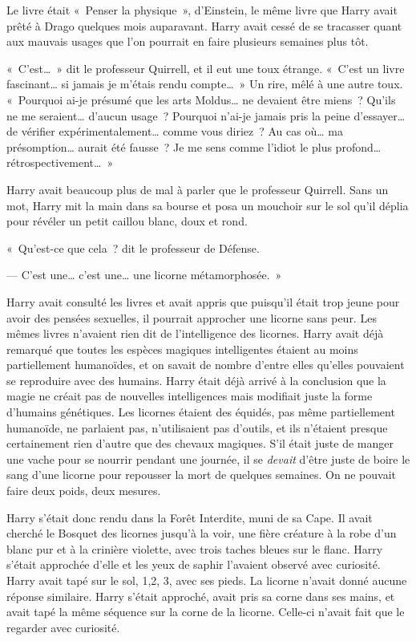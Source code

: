 Le livre était «~Penser la physique~», d'Einstein, le même livre que Harry avait prêté à Drago quelques mois auparavant.
Harry avait cessé de se tracasser quant aux mauvais usages que l'on pourrait en faire plusieurs semaines plus tôt.

«~C'est…~»
 dit le professeur Quirrell, et il eut une toux étrange.
«~C'est un livre fascinant… si jamais je m'étais rendu compte…~»
Un rire, mêlé à une autre toux.
«~Pourquoi ai-je présumé que les arts Moldus… ne devaient être miens~?
Qu'ils ne me seraient… d'aucun usage~?
Pourquoi n'ai-je jamais pris la peine d'essayer… de vérifier expérimentalement… comme vous diriez~?
Au cas où… ma présomption… aurait été fausse~?
Je me sens comme l'idiot le plus profond… rétrospectivement…~»

Harry avait beaucoup plus de mal à parler que le professeur Quirrell.
Sans un mot, Harry mit la main dans sa bourse et posa un mouchoir sur le sol qu'il déplia pour révéler un petit caillou blanc, doux et rond.

«~Qu'est-ce que cela~? dit le professeur de Défense.

--- C'est une… c'est une… une licorne métamorphosée.~»

Harry avait consulté les livres et avait appris que puisqu'il était trop jeune pour avoir des pensées sexuelles, il pourrait approcher une licorne sans peur.
Les mêmes livres n'avaient rien dit de l'intelligence des licornes.
Harry avait déjà remarqué que toutes les espèces magiques intelligentes étaient au moins partiellement humanoïdes, et on savait de nombre d'entre elles qu'elles pouvaient se reproduire avec des humains.
Harry était déjà arrivé à la conclusion que la magie ne créait pas de nouvelles intelligences mais modifiait juste la forme d'humains génétiques.
Les licornes étaient des équidés, pas même partiellement humanoïde, ne parlaient pas, n'utilisaient pas d'outils, et ils n'étaient presque certainement rien d'autre que des chevaux magiques.
S'il était juste de manger une vache pour se nourrir pendant une journée, il se \emph{devait} d'être juste de boire le sang d'une licorne pour repousser la mort de quelques semaines.
On ne pouvait faire deux poids, deux mesures.

Harry s'était donc rendu dans la Forêt Interdite, muni de sa Cape.
Il avait cherché le Bosquet des licornes jusqu'à la voir, une fière créature à la robe d'un blanc pur et à la crinière violette, avec trois taches bleues sur le flanc.
Harry s'était approchée d'elle et les yeux de saphir l'avaient observé avec curiosité.
Harry avait tapé sur le sol, 1,2, 3, avec ses pieds.
La licorne n'avait donné aucune réponse similaire.
Harry s'était approché, avait pris sa corne dans ses mains, et avait tapé la même séquence sur la corne de la licorne.
Celle-ci n'avait fait que le regarder avec curiosité.

